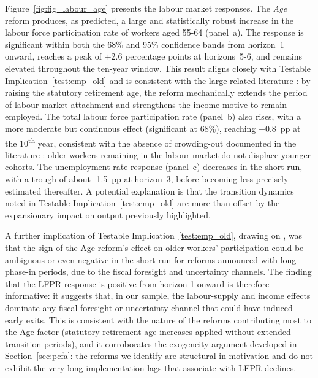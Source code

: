 \documentclass[11pt,english,a4paper, twoside, authoryear]{article}
\begin{document}
Figure~\ref{fig:fig_labour_age} presents the labour market responses. The \textit{Age} reform produces, as predicted, a large and statistically robust increase in the labour force participation rate of workers aged 55-64 (panel~a). The response is significant within both the 68\% and 95\% confidence bands from horizon~1 onward, reaches a peak of $+$2.6 percentage points at horizons~5-6, and remains elevated throughout the ten-year window. This result aligns closely with Testable Implication~\ref{test:emp_old} and is consistent with the large related literature \citep{StaubliZweimuller2013,GruberWise1999}: by raising the statutory retirement age, the reform mechanically extends the period of labour market attachment and strengthens the income motive to remain employed. The total labour force participation rate (panel~b) also rises, with a  more moderate but continuous effect (significant at 68\%), reaching $+$0.8~pp at the 10\textsuperscript{th} year, consistent with the absence of crowding-out documented in the literature \citep{MunnellWu2012,Dai2022}: older workers remaining in the labour market do not displace younger cohorts. The unemployment rate response (panel~c) decreases in the short run, with a trough of about -1.5~pp at horizon~3, before becoming less precisely estimated thereafter.  A potential explanation is that the transition dynamics noted in Testable Implication~\ref{test:emp_old} are more than offset by the expansionary impact on output previously highlighted.

A further implication of Testable Implication~\ref{test:emp_old}, drawing on \citet{BiZubairy2023}, was that the sign of the Age reform's effect on older workers' participation could be ambiguous or even negative in the short run for reforms announced with long phase-in periods, due to the fiscal foresight and uncertainty channels. The finding that the LFPR response is positive from horizon 1 onward is therefore informative: it suggests that, in our sample, the labour-supply and income effects dominate any fiscal-foresight or uncertainty channel that could have induced early exits. This is consistent with the nature of the reforms contributing most to the Age factor (statutory retirement age increases applied without extended transition periods), and it corroborates the exogeneity argument developed in Section~\ref{sec:pcfa}: the reforms we identify are structural in motivation and do not exhibit the very long implementation lags that \citet{BiZubairy2023} associate with LFPR declines.
\end{document}
